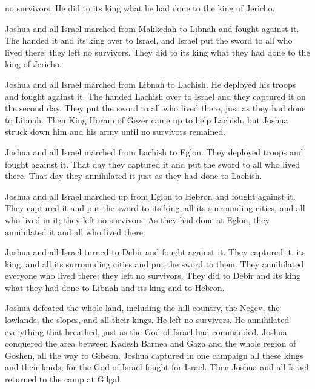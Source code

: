 {no
survivors.
He did
to its king
what
he had done
to the king
of Jericho.
\par }{\PP {}Joshua
and all
Israel
marched from Makkedah
to Libnah
and fought
against it.
The
{}
handed
it and its
king
over
to Israel,
and Israel put
the sword
to all
who
lived
there; they left no
survivors.
They did
to its king
what they had
done
to the king
of Jericho.
\par }{\PP {}Joshua
and all
Israel
marched
from Libnah
to Lachish.
He deployed
his troops and fought against it.
The
{}
handed
Lachish
over to Israel
and they captured
it on the second
day.
They put
the sword
to all
who
lived
there, just
as they had
done
to Libnah.
Then
King
Horam
of Gezer
came up to help
Lachish,
but Joshua
struck
down him and his army
until
no
survivors
remained.
\par }{\PP {}Joshua
and all
Israel
marched
from Lachish
to Eglon.
They deployed
troops and fought
against it.
That day
they captured
it and put
the sword
to all
who
lived
there. That
day
they annihilated
it just
as they had
done
to Lachish.
\par }{\PP {}Joshua
and all
Israel
marched
up from
Eglon
to Hebron
and fought
against it.
They captured
it and put
the sword
to its king,
all
its surrounding cities,
and all
who
lived
in it; they left no
survivors.
As they had
done
at Eglon,
they annihilated
it and all
who
lived there.
\par }{\PP {}Joshua
and all
Israel
turned
to Debir
and fought
against it.
They captured
it, its
king,
and all
its surrounding cities
and put
the sword
to them. They annihilated
everyone
who
lived
there; they left no
survivors.
They did
to Debir
and its king
what they had
done
to Libnah
and its king
and to Hebron.
\par }{\PP {}Joshua
defeated
the
whole
land,
including the hill country,
the Negev,
the lowlands,
the slopes,
and all
their kings.
He left
no
survivors.
He annihilated
everything
that breathed,
just
as the
{}
God
of Israel
had commanded.
Joshua
conquered
the area between
Kadesh Barnea
and Gaza
and the whole
region
of Goshen,
all the way
to Gibeon.
Joshua
captured
in one
campaign
all
these
kings
and their lands,
for
the {}
God
of Israel
fought
for Israel.
Then Joshua
and all
Israel
returned
to
the camp
at Gilgal.

}
